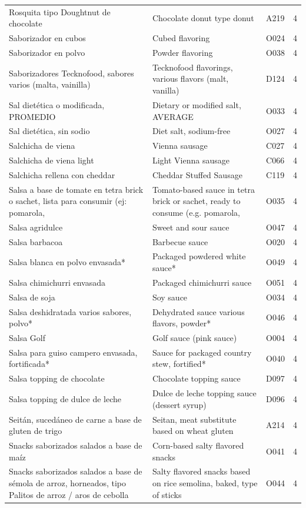 {\begin{longtable}{p{4.3cm}p{5.5cm}p{1.5cm}p{0.7cm}}
Rosquita tipo Doughtnut de chocolate & Chocolate donut type donut & A219 & 4\\
Saborizador en cubos & Cubed flavoring & O024 & 4\\
Saborizador en polvo & Powder flavoring & O038 & 4\\
Saborizadores Tecknofood, sabores varios (malta, vainilla) & Tecknofood flavorings, various flavors (malt, vanilla) & D124 & 4\\
Sal dietética o modificada, PROMEDIO & Dietary or modified salt, AVERAGE & O033 & 4\\
Sal dietética, sin sodio & Diet salt, sodium-free & O027 & 4\\
Salchicha de viena & Vienna sausage & C027 & 4\\
Salchicha de viena light & Light Vienna sausage & C066 & 4\\
Salchicha rellena con cheddar & Cheddar Stuffed Sausage & C119 & 4\\
Salsa a base de tomate en tetra brick o sachet, lista para consumir (ej: pomarola, & Tomato-based sauce in tetra brick or sachet, ready to consume (e.g. pomarola, & O035 & 4\\
Salsa agridulce & Sweet and sour sauce & O047 & 4\\
Salsa barbacoa & Barbecue sauce & O020 & 4\\
Salsa blanca en polvo envasada* & Packaged powdered white sauce* & O049 & 4\\
Salsa chimichurri envasada & Packaged chimichurri sauce & O051 & 4\\
Salsa de soja & Soy sauce & O034 & 4\\
Salsa deshidratada varios sabores, polvo* & Dehydrated sauce various flavors, powder* & O046 & 4\\
Salsa Golf & Golf sauce (pink sauce) & O004 & 4\\
Salsa para guiso campero envasada, fortificada* & Sauce for packaged country stew, fortified* & O040 & 4\\
Salsa topping de chocolate & Chocolate topping sauce & D097 & 4\\
Salsa topping de dulce de leche & Dulce de leche topping sauce (dessert syrup) & D096 & 4\\
Seitán, sucedáneo de carne a base de gluten de trigo & Seitan, meat substitute based on wheat gluten & A214 & 4\\
Snacks saborizados salados a base de maíz & Corn-based salty flavored snacks & O041 & 4\\
Snacks saborizados salados a base de sémola de arroz, horneados, tipo Palitos de arroz / aros de cebolla & Salty flavored snacks based on rice semolina, baked, type of sticks & O044 & 4\\

\end{longtable}}
